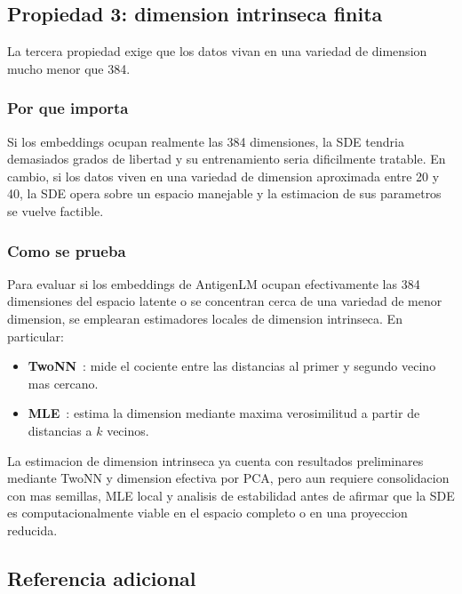 \documentclass[12pt,letterpaper]{article}
\begin{document}
\subsection{Propiedad 3: dimension intrinseca finita}

La tercera propiedad exige que los datos vivan en una variedad de dimension mucho menor que 384.

\subsubsection*{Por que importa}

Si los embeddings ocupan realmente las 384 dimensiones, la SDE tendria demasiados grados de libertad y su entrenamiento seria dificilmente tratable. En cambio, si los datos viven en una variedad de dimension aproximada entre 20 y 40, la SDE opera sobre un espacio manejable y la estimacion de sus parametros se vuelve factible.

\subsubsection*{Como se prueba}

Para evaluar si los embeddings de AntigenLM ocupan efectivamente las 384 dimensiones del espacio latente o se concentran cerca de una variedad de menor dimension, se emplearan estimadores locales de dimension intrinseca. En particular:

\begin{itemize}[leftmargin=2em]
    \item \textbf{TwoNN}~\cite{facco2017intrinsic}: mide el cociente entre las distancias al primer y segundo vecino mas cercano.
    \item \textbf{MLE}~\cite{levina2004mle}: estima la dimension mediante maxima verosimilitud a partir de distancias a $k$ vecinos.
\end{itemize}

La estimacion de dimension intrinseca ya cuenta con resultados preliminares mediante TwoNN y dimension efectiva por PCA, pero aun requiere consolidacion con mas semillas, MLE local y analisis de estabilidad antes de afirmar que la SDE es computacionalmente viable en el espacio completo o en una proyeccion reducida.

\subsection{Referencia adicional}
\end{document}
